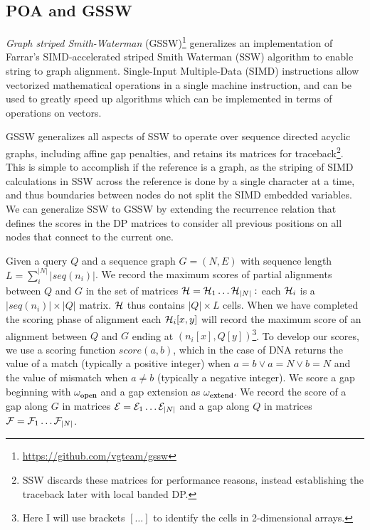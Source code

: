 \subsection{POA and GSSW}

\emph{Graph striped Smith-Waterman} (GSSW)\footnote{\url{https://github.com/vgteam/gssw}} generalizes an implementation \cite{zhao2013ssw} of Farrar's SIMD-accelerated striped Smith Waterman (SSW) algorithm \cite{farrar2007striped} to enable string to graph alignment.
Single-Input Multiple-Data (SIMD) instructions allow vectorized mathematical operations in a single machine instruction, and can be used to greatly speed up algorithms which can be implemented in terms of operations on vectors.

GSSW generalizes all aspects of SSW to operate over sequence directed acyclic graphs, including affine gap penalties, and retains its matrices for traceback\footnote{SSW discards these matrices for performance reasons, instead establishing the traceback later with local banded DP.}.
This is simple to accomplish if the reference is a graph, as the striping of SIMD calculations in SSW across the reference is done by a single character at a time, and thus boundaries between nodes do not split the SIMD embedded variables.
We can generalize SSW to GSSW by extending the recurrence relation that defines the scores in the DP matrices to consider all previous positions on all nodes that connect to the current one.

Given a query $Q$ and a sequence graph $G = (N, E)$ with sequence length $L=\sum_{i}^{|N|} |seq(n_i)|$.
We record the maximum scores of partial alignments between $Q$ and $G$ in the set of matrices ${\cal H} = {\cal H}_1 \ldots {\cal H}_{|N|} :$ each ${\cal H}_i$ is a $|seq(n_i)| \times |Q|$ matrix.
${\cal H}$ thus contains $|Q|\times L$ cells.
When we have completed the scoring phase of alignment each ${\cal H}_{i}[x,y]$ will record the maximum score of an alignment between $Q$ and $G$ ending at $(n_i[x], Q[y])$\footnote{Here I will use brackets $[\ldots]$ to identify the cells in 2-dimensional arrays.}.
To develop our scores, we use a scoring function $score(a, b)$, which in the case of DNA returns the value of a match (typically a positive integer) when $a = b \lor a = N \lor b = N$ and the value of mismatch when $a \neq b$ (typically a negative integer).
We score a gap beginning with $\omega_\textbf{open}$ and a gap extension as $\omega_\textbf{extend}$.
We record the score of a gap along $G$ in matrices ${\cal E} = {\cal E}_1 \ldots {\cal E}_{|N|}$ and a gap along $Q$ in matrices ${\cal F} = {\cal F}_1 \ldots {\cal F}_{|N|}$.

